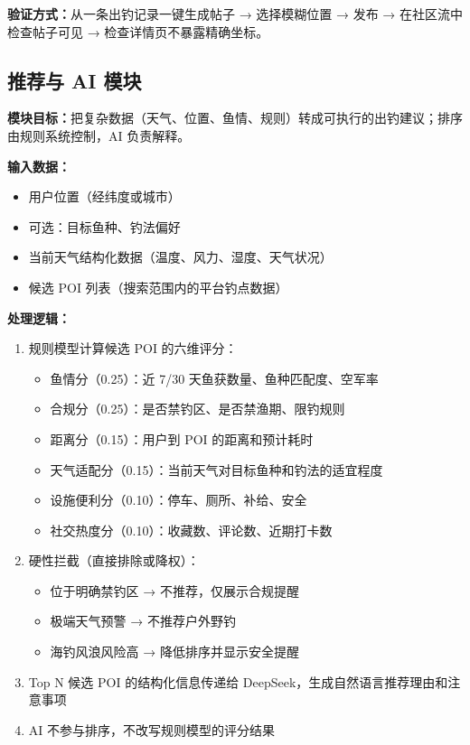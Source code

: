 \textbf{验证方式：}从一条出钓记录一键生成帖子 → 选择模糊位置 → 发布 → 在社区流中检查帖子可见 → 检查详情页不暴露精确坐标。

\subsection{推荐与 AI 模块}

\textbf{模块目标：}把复杂数据（天气、位置、鱼情、规则）转成可执行的出钓建议；排序由规则系统控制，AI 负责解释。

\textbf{输入数据：}
\begin{itemize}
  \item 用户位置（经纬度或城市）
  \item 可选：目标鱼种、钓法偏好
  \item 当前天气结构化数据（温度、风力、湿度、天气状况）
  \item 候选 POI 列表（搜索范围内的平台钓点数据）
\end{itemize}

\textbf{处理逻辑：}
\begin{enumerate}
  \item 规则模型计算候选 POI 的六维评分：
  \begin{itemize}
    \item 鱼情分（0.25）：近 7/30 天鱼获数量、鱼种匹配度、空军率
    \item 合规分（0.25）：是否禁钓区、是否禁渔期、限钓规则
    \item 距离分（0.15）：用户到 POI 的距离和预计耗时
    \item 天气适配分（0.15）：当前天气对目标鱼种和钓法的适宜程度
    \item 设施便利分（0.10）：停车、厕所、补给、安全
    \item 社交热度分（0.10）：收藏数、评论数、近期打卡数
  \end{itemize}
  \item 硬性拦截（直接排除或降权）：
  \begin{itemize}
    \item 位于明确禁钓区 → 不推荐，仅展示合规提醒
    \item 极端天气预警 → 不推荐户外野钓
    \item 海钓风浪风险高 → 降低排序并显示安全提醒
  \end{itemize}
  \item Top N 候选 POI 的结构化信息传递给 DeepSeek，生成自然语言推荐理由和注意事项
  \item AI 不参与排序，不改写规则模型的评分结果
\end{enumerate}

